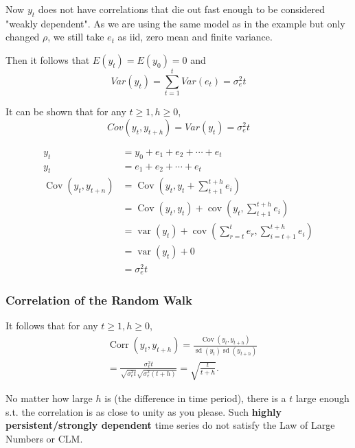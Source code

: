 \documentclass[11pt]{article}
\begin{document}
Now $y_t$ does not have correlations that die out fast enough to be considered "weakly dependent". As we are using the same model as in the example but only changed $\rho$, we still take $e_t$ as iid, zero mean and finite variance.

Then it follows that $E(y_t) = E(y_0) = 0$ and 
\[Var(y_t) = \sum_{t=1}^t Var(e_t) = \sigma_e^2 t\]

It can be shown that for any $t\geq 1, h\geq 0$,
\[Cov(y_t, y_{t+h}) = Var(y_t) = \sigma_e^2 t\]

\clearpage
\begin{mdframed}
\begin{equation}
    \begin{aligned}
y_{t}& =y_{0} +e_{1}+e_{2}+\cdots+e_{t} \\
y_t &= e_{1}+e_{2}+\cdots+e_{t} \\
\operatorname{Cov}\left(y_{t}, y_{t+n}\right) &=\operatorname{Cov}\left(y_{t}, y_{t}+\sum_{t+1}^{t+h} e_{i}\right) \\
&=\operatorname{Cov}\left(y_{t}, y_{t}\right)+\operatorname{cov}\left(y_{t}, \sum_{t+1}^{t+h} e_{i}\right) \\
&=\operatorname{var}\left(y_{t}\right)+\operatorname{cov}\left(\sum_{r = t}^{t}e_r, \sum_{i = t +1}^{t+h}e_i\right) \\
&=\operatorname{var}\left(y_{t}\right) + 0 \\
&= \sigma_e^2t
\end{aligned}
\end{equation}
\end{mdframed}

\subsubsection{Correlation of the Random Walk}

It follows that for any $t\geq 1, h\geq 0$,
\begin{equation}
\begin{aligned}
& \operatorname{Corr}\left(y_t, y_{t+h}\right)=\frac{\operatorname{Cov}\left(y_t, y_{t+h}\right)}{\operatorname{sd}\left(y_t\right) \operatorname{sd}\left(y_{t+h}\right)} \\
& =\frac{\sigma_e^2 t}{\sqrt{\sigma_e^2 t} \sqrt{\sigma_e^2(t+h)}}=\sqrt{\frac{t}{t+h}} .
\end{aligned}
\end{equation}

No matter how large $h$ is (the difference in time period), there is a $t$ large enough s.t. the correlation is as close to unity as you please. Such \textbf{highly persistent/strongly dependent} time series do not satisfy the Law of Large Numbers or CLM.
\end{document}
